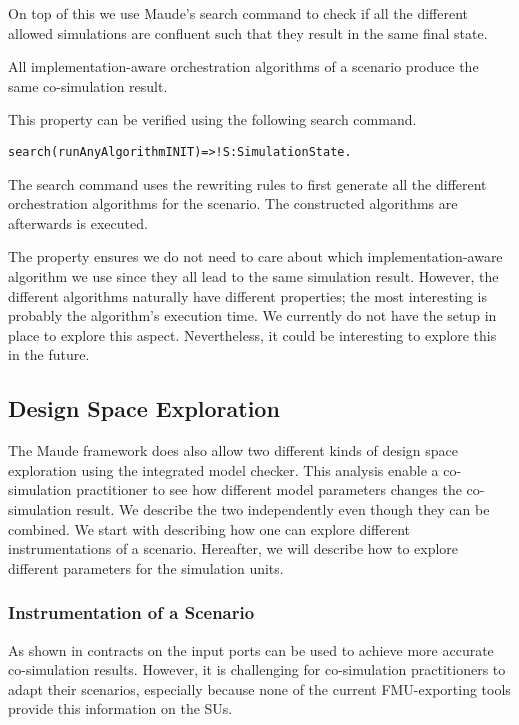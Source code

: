 On top of this we use Maude's search command to check if all the different allowed simulations are confluent such that they result in the same final state.

\begin{lemma}
  All implementation-aware orchestration algorithms of a scenario produce the same co-simulation result.
\end{lemma}

This property can be verified using the following search command.

\begin{alltt}
  search (runAnyAlgorithm INIT)  =>! S:SimulationState . 
\end{alltt}
The search command uses the rewriting rules to first generate all the different orchestration algorithms for the scenario.
The constructed algorithms are afterwards is executed.

The property ensures we do not need to care about which implementation-aware algorithm we use since they all lead to the same simulation result.
However, the different algorithms naturally have different properties; the most interesting is probably the algorithm's execution time. 
We currently do not have the setup in place to explore this aspect.
Nevertheless, it could be interesting to explore this in the future.


\subsection{Design Space Exploration}
The Maude framework does also allow two different kinds of design space exploration using the integrated model checker.
This analysis enable a co-simulation practitioner to see how different model parameters changes the co-simulation result.
We describe the two independently even though they can be combined.
We start with describing how one can explore different instrumentations of a scenario.
Hereafter, we will describe how to explore different parameters for the simulation units.  

\subsubsection{Instrumentation of a Scenario}
As shown in \cite{Gomes2019,Oakes2021,hansen_verification_2021} contracts on the input ports can be used to achieve more accurate co-simulation results.
However, it is challenging for co-simulation practitioners to adapt their scenarios, especially because none of the current FMU-exporting tools provide this information on the SUs.

